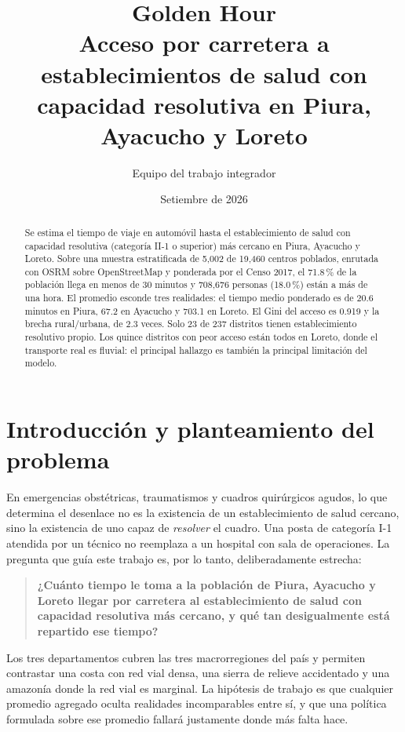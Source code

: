 \documentclass[11pt,a4paper]{article}
\title{\vspace{-1.2cm}\textbf{Golden Hour}\\[0.25em]
\large Acceso por carretera a establecimientos de salud con capacidad
resolutiva en Piura, Ayacucho y Loreto}
\author{Equipo del trabajo integrador}
\date{Setiembre de 2026}
\begin{document}
\maketitle
\vspace{-0.6cm}

\begin{abstract}
\noindent
Se estima el tiempo de viaje en automóvil hasta el establecimiento de salud
con capacidad resolutiva (categoría II-1 o superior) más cercano en Piura,
Ayacucho y Loreto. Sobre una muestra estratificada de 5{,}002 de 19{,}460
centros poblados, enrutada con OSRM sobre OpenStreetMap y ponderada por el
Censo 2017, el 71.8\,\% de la población llega en menos de 30 minutos y
708{,}676 personas (18.0\,\%) están a más de una hora. El promedio esconde
tres realidades: el tiempo medio ponderado es de 20.6 minutos en Piura, 67.2
en Ayacucho y 703.1 en Loreto. El Gini del acceso es 0.919 y la brecha
rural/urbana, de 2.3 veces. Solo 23 de 237 distritos tienen establecimiento
resolutivo propio. Los quince distritos con peor acceso están todos en
Loreto, donde el transporte real es fluvial: el principal hallazgo es también
la principal limitación del modelo.
\end{abstract}

\section{Introducción y planteamiento del problema}

En emergencias obstétricas, traumatismos y cuadros quirúrgicos agudos, lo que
determina el desenlace no es la existencia de un establecimiento de salud
cercano, sino la existencia de uno capaz de \emph{resolver} el cuadro. Una
posta de categoría I-1 atendida por un técnico no reemplaza a un hospital con
sala de operaciones. La pregunta que guía este trabajo es, por lo tanto,
deliberadamente estrecha:

\begin{quote}
\textbf{¿Cuánto tiempo le toma a la población de Piura, Ayacucho y Loreto
llegar por carretera al establecimiento de salud con capacidad resolutiva más
cercano, y qué tan desigualmente está repartido ese tiempo?}
\end{quote}

Los tres departamentos cubren las tres macrorregiones del país y permiten
contrastar una costa con red vial densa, una sierra de relieve accidentado y
una amazonía donde la red vial es marginal. La hipótesis de trabajo es que
cualquier promedio agregado oculta realidades incomparables entre sí, y que
una política formulada sobre ese promedio fallará justamente donde más falta
hace.
\end{document}
